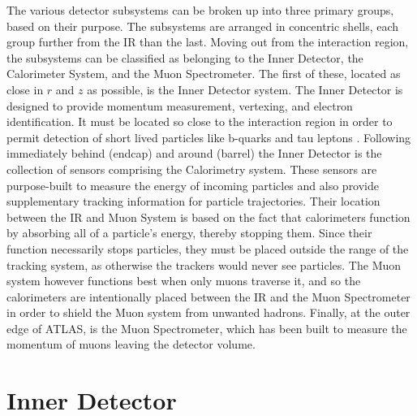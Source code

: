     The various detector subsystems can be broken up into three primary groups, based on their purpose.
    The subsystems are arranged in concentric shells, each group further from the IR than the last.
    Moving out from the interaction region, the subsystems can be classified as belonging to the Inner Detector, the Calorimeter System, and the Muon Spectrometer.
    The first of these, located as close in $r$ and $z$ as possible, is the Inner Detector system.
    The Inner Detector is designed to provide momentum measurement, vertexing, and electron identification.
    It must be located so close to the interaction region in order to permit detection of short lived particles like b-quarks and tau leptons \cite{id_tdr}.
    Following immediately behind (endcap) and around (barrel) the Inner Detector is the collection of sensors comprising the Calorimetry system.
    These sensors are purpose-built to measure the energy of incoming particles and also provide supplementary tracking information for particle trajectories.
    Their location between the IR and Muon System is based on the fact that calorimeters function by absorbing all of a particle's energy, thereby stopping them.
    Since their function necessarily stops particles, they must be placed outside the range of the tracking system, as otherwise the trackers would never see particles.
    The Muon system however functions best when only muons traverse it, and so the calorimeters are intentionally placed between the IR and the Muon Spectrometer in order to shield the Muon system from unwanted hadrons.
    Finally, at the outer edge of ATLAS, is the Muon Spectrometer, which has been built to measure the momentum of muons leaving the detector volume.

\section{Inner Detector} \label{sec:inner_detector}
    
